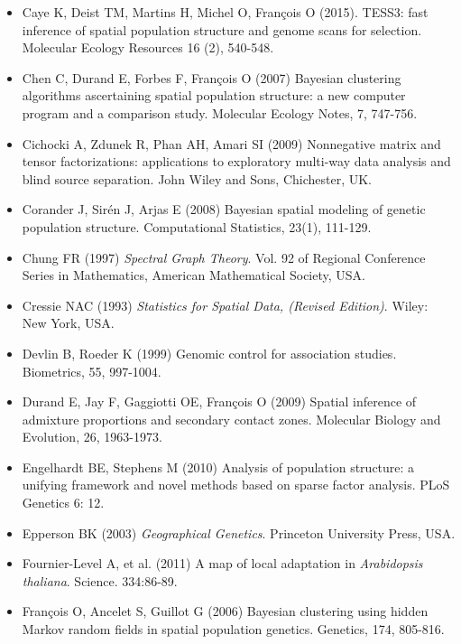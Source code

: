 \begin{itemize}
\item[] Caye K, Deist TM, Martins H, Michel O, Fran\c cois O (2015). TESS3: fast inference of spatial population structure and genome scans for selection. Molecular Ecology Resources 16 (2), 540-548.

\item[] Chen C, Durand E, Forbes F, Fran\c cois O (2007) Bayesian clustering algorithms ascertaining spatial population structure: a new computer program and a comparison study. Molecular Ecology Notes, 7, 747-756.

\item[]  Cichocki A, Zdunek R, Phan AH, Amari SI (2009) Nonnegative matrix and tensor factorizations: applications to exploratory multi-way data analysis and blind source separation. John Wiley and Sons, Chichester, UK.

\item[] Corander J, Sir\'en J,  Arjas E (2008) Bayesian spatial modeling of genetic population structure. Computational Statistics, 23(1), 111-129.

\item[] Chung FR (1997) {\it Spectral Graph Theory}. Vol. 92 of Regional Conference Series in Mathematics, American Mathematical Society, USA.

\item[] Cressie NAC (1993) {\it Statistics for Spatial Data, (Revised Edition)}. Wiley: New York, USA.

\item[] Devlin B, Roeder K (1999) Genomic control for association studies. Biometrics, 55, 997-1004.

\item[] Durand E, Jay F, Gaggiotti OE, Fran\c cois O (2009) Spatial inference of admixture proportions and secondary contact zones. Molecular Biology and Evolution, 26, 1963-1973.

\item[] Engelhardt BE, Stephens M (2010) Analysis of population structure: a unifying framework and novel methods based on sparse factor analysis. PLoS Genetics 6: 12.

\item[] Epperson BK (2003) {\it Geographical Genetics}. Princeton University Press, USA.


\item[] Fournier-Level A, et al. (2011) A map of local adaptation in {\it Arabidopsis thaliana}. Science. 334:86-89. 

\item[] Fran\c cois O, Ancelet S, Guillot G (2006) Bayesian clustering using hidden Markov random fields in spatial population genetics. Genetics, 174, 805-816.


\end{itemize}
